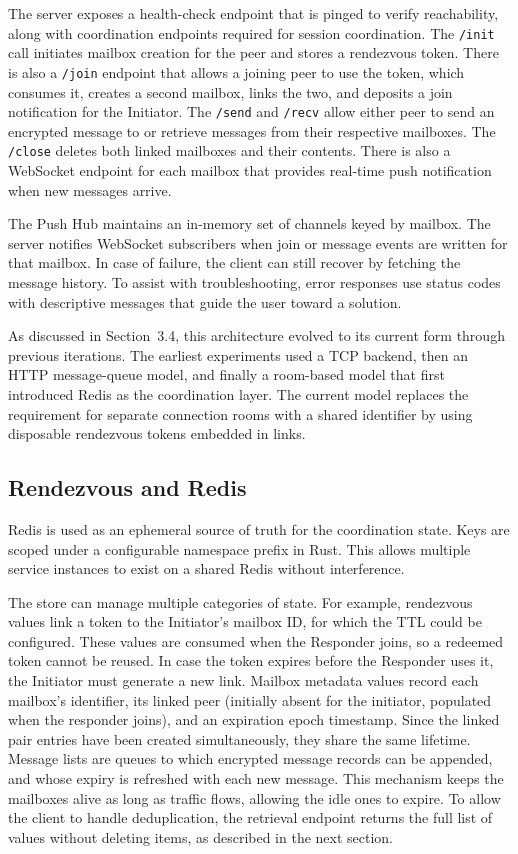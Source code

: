 \documentclass[12pt,a4paper,oneside]{report}
\begin{document}
The server exposes a health-check endpoint that is pinged to verify reachability, along with coordination endpoints required for session coordination. The \texttt{/init} call initiates mailbox creation for the peer and stores a rendezvous token. There is also a \texttt{/join} endpoint that allows a joining peer to use the token, which consumes it, creates a second mailbox, links the two, and deposits a join notification for the Initiator. The \texttt{/send} and \texttt{/recv} allow either peer to send an encrypted message to or retrieve messages from their respective mailboxes. The \texttt{/close} deletes both linked mailboxes and their contents. There is also a WebSocket endpoint for each mailbox that provides real-time push notification when new messages arrive.

The Push Hub maintains an in-memory set of channels keyed by mailbox. The server notifies WebSocket subscribers when join or message events are written for that mailbox. In case of failure, the client can still recover by fetching the message history. To assist with troubleshooting, error responses use status codes with descriptive messages that guide the user toward a solution.

As discussed in Section~3.4, this architecture evolved to its current form through previous iterations. The earliest experiments used a TCP backend, then an HTTP message-queue model, and finally a room-based model that first introduced Redis as the coordination layer. The current model replaces the requirement for separate connection rooms with a shared identifier by using disposable rendezvous tokens embedded in links.


\subsection{Rendezvous and Redis}
\label{sec:rendezvous-redis}

Redis is used as an ephemeral source of truth for the coordination state. Keys are scoped under a configurable namespace prefix in Rust. This allows multiple service instances to exist on a shared Redis without interference.

The store can manage multiple categories of state. For example, rendezvous values link a token to the Initiator's mailbox ID, for which the TTL could be configured. These values are consumed when the Responder joins, so a redeemed token cannot be reused. In case the token expires before the Responder uses it, the Initiator must generate a new link. Mailbox metadata values record each mailbox's identifier, its linked peer (initially absent for the initiator, populated when the responder joins), and an expiration epoch timestamp. Since the linked pair entries have been created simultaneously, they share the same lifetime. Message lists are queues to which encrypted message records can be appended, and whose expiry is refreshed with each new message. This mechanism keeps the mailboxes alive as long as traffic flows, allowing the idle ones to expire. To allow the client to handle deduplication, the retrieval endpoint returns the full list of values without deleting items, as described in the next section.
\end{document}
